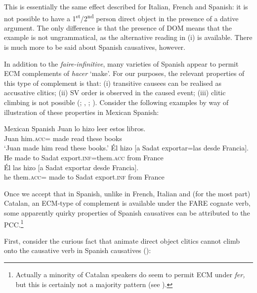 \documentclass[output=paper,colorlinks,citecolor=brown,nonflat]{./langscibook}
\begin{document}
This is essentially the same effect described for Italian, French and Spanish: it is not possible to have a 1\textsuperscript{st}/2\textsuperscript{nd} person direct object in the presence of a dative argument. The only difference is that the presence of DOM means that the example is not ungrammatical, as the alternative reading in (i) is available. There is much more to be said about Spanish causatives, however. 

In addition to the \textit{faire-infinitive}, many varieties of Spanish appear to permit ECM complements of \textit{hacer} ‘make’. For our purposes, the relevant properties of this type of complement is that: (i) transitive causees can be realised as accusative clitics; (ii) SV order is observed in the caused event; (iii) clitic climbing is not possible (\citealt{Strozer1976}; \citealt{Treviño1992}, \citeyear{Treviño1993}; \citealt{Torrego2010, TubinoBlanco2011}). Consider the following examples by way of illustration of these properties in Mexican Spanish:

\ea%
    \label{ex:sheehan:32}
    Mexican Spanish \citep[311, 169]{Treviño1992}
    \ea\label{ex:sheehan:32a}
    \gll    Juan lo     hizo   leer   estos libros.\\
            Juan him\textsc{.acc}=  made   read   these books\\
    \glt    ‘Juan made him read these books.’  
    \ex\label{ex:sheehan:32b}
    \gll    Él  hizo  [a   Sadat  exportar=las      desde   Francia].\\
            He  made    {\db}to   Sadat  export.\textsc{inf}=them.\textsc{acc}   from   France\\
    \ex\label{ex:sheehan:32c}
    \gll    *Él  las  hizo [a   Sadat   exportar   desde   Francia].\\
            he them.\textsc{acc}=   made   {\db}to Sadat   export.\textsc{inf} from   France\\
    \z
\z 

Once we accept that in Spanish, unlike in French, Italian and (for the most part) Catalan, an ECM-type of complement is available under the FARE cognate verb, some apparently quirky properties of Spanish causatives can be attributed to the PCC.\footnote{Actually a minority of Catalan speakers do seem to permit ECM under \textit{fer,} but this is certainly not a majority pattern (see \citealt{PinedaSchifanoSheehan2018}).}  

First, consider the curious fact that animate direct object clitics cannot climb onto the causative verb in Spanish causatives (\citealt{Rivas1977, Bordelois1988, Torrego2010}):
\end{document}
